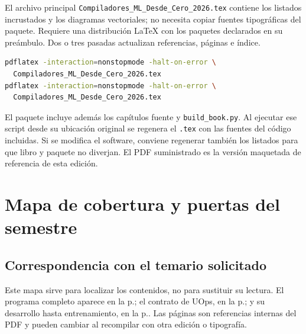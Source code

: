 \documentclass[12pt,a4paper,oneside]{report}
\begin{document}
El archivo principal \texttt{Compiladores\_ML\_Desde\_Cero\_2026.tex} contiene los listados incrustados y los diagramas vectoriales; no necesita copiar fuentes tipográficas del paquete. Requiere una distribución LaTeX con los paquetes declarados en su preámbulo. Dos o tres pasadas actualizan referencias, páginas e índice.

\begin{lstlisting}[language=bash]
pdflatex -interaction=nonstopmode -halt-on-error \
  Compiladores_ML_Desde_Cero_2026.tex
pdflatex -interaction=nonstopmode -halt-on-error \
  Compiladores_ML_Desde_Cero_2026.tex
\end{lstlisting}

El paquete incluye además los capítulos fuente y \texttt{build\_book.py}. Al ejecutar ese script desde su ubicación original se regenera el \texttt{.tex} con las fuentes del código incluidas. Si se modifica el software, conviene regenerar también los listados para que libro y paquete no diverjan. El PDF suministrado es la versión maquetada de referencia de esta edición.

\chapter{Mapa de cobertura y puertas del semestre}\label{app:cobertura}

\section{Correspondencia con el temario solicitado}
Este mapa sirve para localizar los contenidos, no para sustituir su lectura. El programa completo aparece en la p.\pageref{curso:programa}; el contrato de UOps, en la p.\pageref{curso:contrato}; y su desarrollo hasta entrenamiento, en la p.\pageref{curso:rangeify}. Las páginas son referencias internas del PDF y pueden cambiar al recompilar con otra edición o tipografía.
\end{document}
